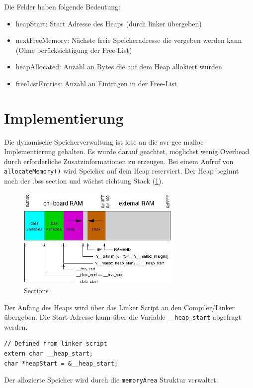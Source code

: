\documentclass[fontsize=12pt, toc=bibliography, notitlepage]{scrreprt}
\begin{document}
Die Felder haben folgende Bedeutung:

\begin{itemize}
	\item heapStart: Start Adresse des Heaps (durch linker übergeben)
	\item nextFreeMemory: Nächste freie Speicheradresse die vergeben werden kann (Ohne berücksichtigung der Free-List)
	\item heapAllocated: Anzahl an Bytes die auf dem Heap allokiert wurden
	\item freeListEntries: Anzahl an Einträgen in der Free-List
\end{itemize}

\section{Implementierung}
\label{subsec:mem-impl}
Die dynamische Speicherverwaltung ist lose an die avr-gcc malloc Implementierung gehalten. Es wurde darauf geachtet, möglichst wenig Overhead durch erforderliche Zusatzinformationen zu erzeugen. Bei einem Aufruf von \lstinline$allocateMemory()$ wird Speicher auf dem Heap reserviert. Der Heap beginnt nach der .bss section und wächst richtung Stack (\ref{fig:sections}).

\begin{figure}[H]
	\centering
	\includegraphics[width=300px]{images/malloc-std.png}
	\caption{Sections}
	\label{fig:sections}
\end{figure}

Der Anfang des Heaps wird über das Linker Script an den Compiler/Linker übergeben. Die Start-Adresse kann über die Variable \lstinline$__heap_start$ abgefragt werden.

\begin{lstlisting}[title=memory.c]
// Defined from linker script
extern char __heap_start;
char *heapStart = &__heap_start;
\end{lstlisting}

Der allozierte Speicher wird durch die \lstinline$memoryArea$ Struktur verwaltet. 
\end{document}
